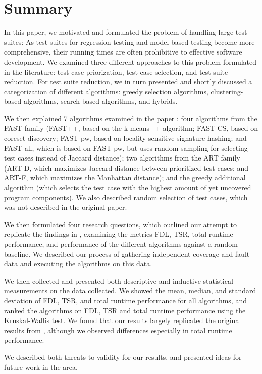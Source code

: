 
\chapter{Summary}\label{chapter:summary}

In this paper, we motivated and formulated the problem of handling large
test suites: As test suites for regression testing and model-based testing
become more comprehensive, their running times are often prohibitive to
effective software development. We examined three different approaches
to this problem formulated in the literature: test case priorization,
test case selection, and test suite reduction. For test suite reduction,
we in turn presented and shortly discussed a categorization of different
algorithms: greedy selection algorithms, clustering-based algorithms,
search-based algorithms, and hybrids.

We then explained 7 algorithms examined in the paper
\cite{cruciani2019scalable}: four algorithms from the FAST family (FAST++,
based on the k-means++ algorithm; FAST-CS, based on coreset discovery;
FAST-pw, based on locality-sensitive signature hashing; and FAST-all,
which is based on FAST-pw, but uses random sampling for selecting test
cases instead of Jaccard distance); two algorithms from the ART family
(ART-D, which maximizes Jaccard distance between prioritized test cases;
and ART-F, which maximizes the Manhattan distance); and the greedy
additional algorithm (which selects the test case with the highest amount
of yet uncovered program components). We also described random selection
of test cases, which was not described in the original paper.

We then formulated four research questions, which outlined our attempt
to replicate the findings in \cite{cruciani2019scalable}, examining
the metrics FDL, TSR, total runtime performance, and performance of
the different algorithms against a random baseline. We described our
process of gathering independent coverage and fault data and executing
the algorithms on this data.

We then collected and presented both descriptive and inductive statistical
measurements on the data collected. We showed the mean, median, and
standard deviation of FDL, TSR, and total runtime performance for all
algorithms, and ranked the algorithms on FDL, TSR and total runtime
performance using the Kruskal-Wallis test. We found that our results largely
replicated the original results from \cite{cruciani2019scalable}, although
we observed differences especially in total runtime performance.

We described both threats to validity for our results, and presented
ideas for future work in the area.
